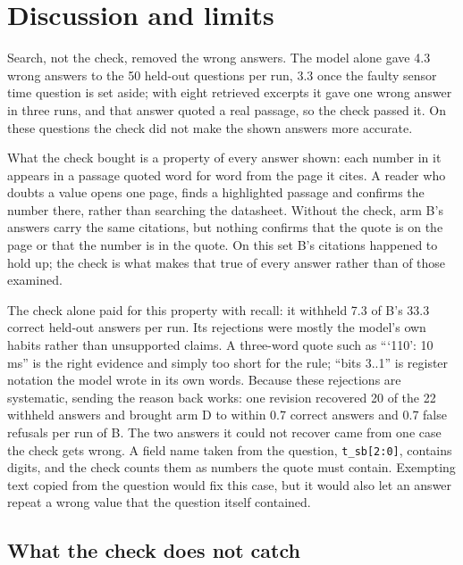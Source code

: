 \section{Discussion and limits}
\label{sec:discussion}

Search, not the check, removed the wrong answers. The model alone gave 4.3 wrong answers to the 50 held-out questions per run, 3.3 once the faulty sensor time question is set aside; with eight retrieved excerpts it gave one wrong answer in three runs, and that answer quoted a real passage, so the check passed it. On these questions the check did not make the shown answers more accurate.

What the check bought is a property of every answer shown: each number in it appears in a passage quoted word for word from the page it cites. A reader who doubts a value opens one page, finds a highlighted passage and confirms the number there, rather than searching the datasheet. Without the check, arm B's answers carry the same citations, but nothing confirms that the quote is on the page or that the number is in the quote. On this set B's citations happened to hold up; the check is what makes that true of every answer rather than of those examined.

The check alone paid for this property with recall: it withheld 7.3 of B's 33.3 correct held-out answers per run. Its rejections were mostly the model's own habits rather than unsupported claims. A three-word quote such as \enquote{\enquote{110}: 10 ms} is the right evidence and simply too short for the rule; \enquote{bits 3..1} is register notation the model wrote in its own words. Because these rejections are systematic, sending the reason back works: one revision recovered 20 of the 22 withheld answers and brought arm D to within 0.7 correct answers and 0.7 false refusals per run of B. The two answers it could not recover came from one case the check gets wrong. A field name taken from the question, \texttt{t\_sb[2:0]}, contains digits, and the check counts them as numbers the quote must contain. Exempting text copied from the question would fix this case, but it would also let an answer repeat a wrong value that the question itself contained.

\subsection{What the check does not catch}

